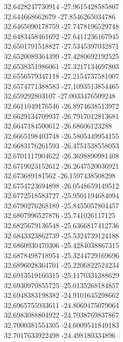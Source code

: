 {32.6428247730914	-27.9615428585807\\
32.644668662679	-27.8546265034786\\
32.6465090178759	-27.7478196529748\\
32.6483458461692	-27.6411236167945\\
32.6501791518827	-27.5345397032871\\
32.6520089364399	-27.4280692192525\\
32.6538351986061	-27.3217134697803\\
32.6556579347118	-27.2154737581007\\
32.6574771388583	-27.1093513854465\\
32.659292803107	-27.0033476509248\\
32.6611049176546	-26.8974638513972\\
32.6629134709937	-26.7917012813681\\
32.6647184500612	-26.68606123288\\
32.6665198403748	-26.5805449954155\\
32.6683176261593	-26.4751538558053\\
32.6701117904622	-26.3698890981408\\
32.6719023152612	-26.2647520036921\\
32.673689181562	-26.1597438508298\\
32.6754723694898	-26.0548659149512\\
32.6772518583727	-25.9501194684094\\
32.6790276268189	-25.8455057804457\\
32.6807996527876	-25.741026117125\\
32.6825679136548	-25.6366817412736\\
32.6843323862739	-25.5324739124188\\
32.6860930470306	-25.4284038867315\\
32.6878498718954	-25.3244729169696\\
32.6896028364701	-25.2206822524234\\
32.6913519160315	-25.1170331388629\\
32.6930970855725	-25.0135268184857\\
32.6948383198382	-24.9101645298662\\
32.6965755933611	-24.8069475079064\\
32.6983088804922	-24.7038769837867\\
32.7000381554305	-24.6009541849183\\
32.7017633922498	-24.498180334896\\
}
